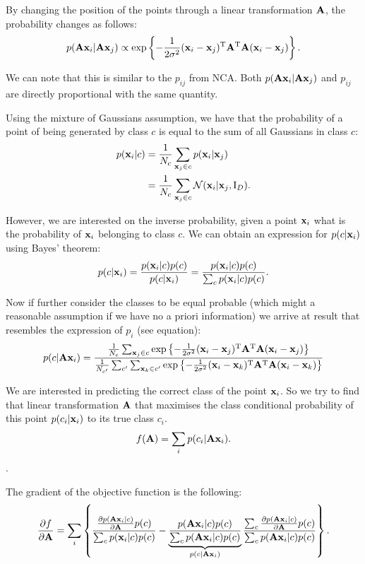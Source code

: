 By changing the position of the points through a linear transformation $\mathbf{A}$, the probability changes as follows:
\begin{align}
	p(\mathbf{A}\mathbf{x}_i|\mathbf{A}\mathbf{x}_j) \propto \exp \left\{-\frac{1}{2\sigma^2} (\mathbf{x}_i - \mathbf{x}_j)^\mathrm{T}\mathbf{A}^\mathrm{T}\mathbf{A}(\mathbf{x}_i - \mathbf{x}_j)\right\}.
\end{align}

We can note that this is similar to the $p_{ij}$ from NCA. Both $p(\mathbf{A}\mathbf{x}_i|\mathbf{A}\mathbf{x}_j)$ and $p_{ij}$ are directly proportional with the same quantity.

Using the mixture of Gaussians assumption, we have that the probability of a point of being generated by class $c$ is equal to the sum of all Gaussians in class $c$:
\begin{align}
	p(\mathbf{x}_i|c) &= \frac{1}{N_c}\sum_{\mathbf{x}_j \in c} p(\mathbf{x}_i|\mathbf{x}_j)\\
			   &= \frac{1}{N_c}\sum_{\mathbf{x}_j \in c} \mathcal{N}(\mathbf{x}_i|\mathbf{x}_j, \mathrm{I}_D).
\end{align}

However, we are interested on the inverse probability, given a point $\mathbf{x}_i$ what is the probability of $\mathbf{x}_i$ belonging to class $c$. We can obtain an expression for $p(c|\mathbf{x}_i)$ using Bayes' theorem:
\begin{align}
	p(c|\mathbf{x}_i) = \frac{p(\mathbf{x}_i|c)p(c)}{p(c|\mathbf{x}_i)} = \frac{p(\mathbf{x}_i|c)p(c)}{\sum_{c} p(\mathbf{x}_i|c)p(c)}.
\end{align}

Now if further consider the classes to be equal probable (which might a reasonable assumption if we have no a priori information) we arrive at result that resembles the expression of $p_i$ (see equation):
\begin{align}
	p(c|\mathbf{A}\mathbf{x}_i) = \frac{
				\frac{1}{N_c}\sum_{\mathbf{x}_j \in c}\exp\left\{-\frac{1}{2\sigma^2}(\mathbf{x}_i - \mathbf{x}_j)^\mathrm{T}\mathbf{A}^\mathrm{T}\mathbf{A}(\mathbf{x}_i - \mathbf{x}_j)\right\}
				}
				{
				\frac{1}{N_{c'}}\sum_{c'} \sum_{\mathbf{x}_k \in c'}\exp\left\{-\frac{1}{2\sigma^2}(\mathbf{x}_i - \mathbf{x}_k)^\mathrm{T}\mathbf{A}^\mathrm{T}\mathbf{A}(\mathbf{x}_i - \mathbf{x}_k)\right\} 
				}
\end{align}

We are interested in predicting the correct class of the point $\mathbf{x}_i$. So we try to find that linear transformation $\mathbf{A}$ that maximises the class conditional probability of this point $p(c_i|\mathbf{x}_i)$ to its true class $c_i$. 
\begin{align}
	f(\mathbf{A}) = \sum_i p(c_i|\mathbf{A}\mathbf{x}_i).
\end{align}.

The gradient of the objective function is the following:
\begin{align}
	\frac{\partial f}{\partial \mathbf{A}} = 
	  \sum_i \left\{ 
	  			\frac
	  			{
	  				\frac{\partial p(\mathbf{A}\mathbf{x}_i|c)}{\partial \mathbf{A}}p(c)
	  			}
	  			{
	  				\sum_c p(\mathbf{x}_i|c)p(c)
	  			}
	  			- \underbrace{\frac{
	  				p(\mathbf{A}\mathbf{x}_i|c)p(c)
	  			}{
	  				\sum_c p(\mathbf{A}\mathbf{x}_i|c)p(c)		
	  			}}_{p(c|\mathbf{A}\mathbf{x}_i)}
	  			\frac{
	  				\sum_c \frac{\partial p(\mathbf{A}\mathbf{x}_i|c)}{\partial \mathbf{A}}p(c)
	  			}{
	  				\sum_c p(\mathbf{A}\mathbf{x}_i|c)p(c)
	  			}
	  	     \right \}.
\end{align}